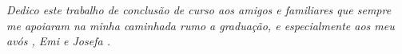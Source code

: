 \begin{dedicatoria}
   \vspace*{\fill}
   \centering
   \noindent

   \textit{Dedico este trabalho de conclusão de curso aos amigos e familiares que sempre me apoiaram na minha caminhada rumo a graduação, e especialmente aos meu avós , Emi e Josefa .} \vspace*{\fill}
\end{dedicatoria}
